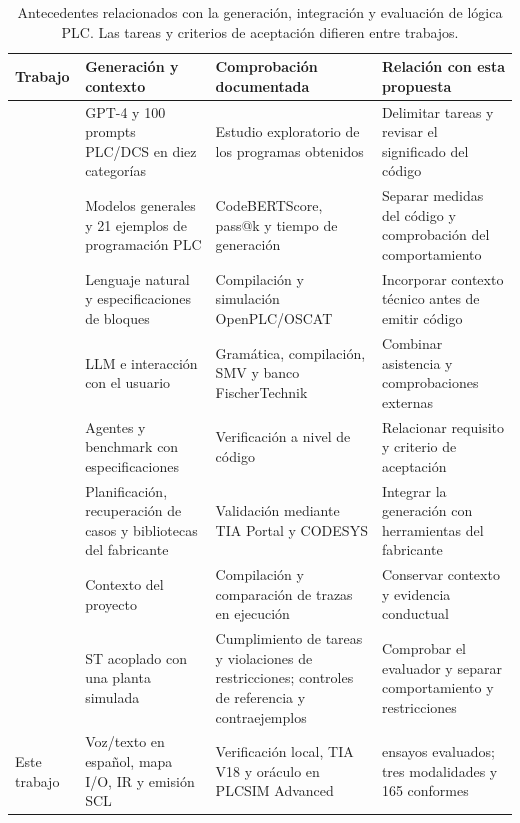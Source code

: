 \documentclass[a4paper,fleqn]{cas-dc}
\begin{document}
\begin{table}[!tp]
\caption{Antecedentes relacionados con la generación, integración y evaluación de lógica PLC. Las tareas y criterios de aceptación difieren entre trabajos.}
\label{tab:comparativa}
\small
\begin{tabularx}{\textwidth}{@{}p{} >{\raggedright\arraybackslash}X >{\raggedright\arraybackslash}X >{\raggedright\arraybackslash}X@{}}
\toprule Trabajo & Generación y contexto & Comprobación documentada & Relación con esta propuesta\\ \midrule
\citet{koziolek2023chatgpt} & GPT-4 y 100 prompts PLC/DCS en diez categorías & Estudio exploratorio de los programas obtenidos & Delimitar tareas y revisar el significado del código\\
\citet{tran2024universal} & Modelos generales y 21 ejemplos de programación PLC & CodeBERTScore, pass@k y tiempo de generación & Separar medidas del código y comprobación del comportamiento\\
\citet{koziolek2024rag} & Lenguaje natural y especificaciones de bloques & Compilación y simulación OpenPLC/OSCAT & Incorporar contexto técnico antes de emitir código\\
\citet{fakih2024llm4plc} & LLM e interacción con el usuario & Gramática, compilación, SMV y banco FischerTechnik & Combinar asistencia y comprobaciones externas\\
\citet{liu2024agents4plc} & Agentes y benchmark con especificaciones & Verificación a nivel de código & Relacionar requisito y criterio de aceptación\\
\citet{yang2025autoplc} & Planificación, recuperación de casos y bibliotecas del fabricante & Validación mediante TIA Portal y CODESYS & Integrar la generación con herramientas del fabricante\\
\citet{tu2026semaplc} & Contexto del proyecto & Compilación y comparación de trazas en ejecución & Conservar contexto y evidencia conductual\\
\citet{kim2026plcworld} & ST acoplado con una planta simulada & Cumplimiento de tareas y violaciones de restricciones; controles de referencia y contraejemplos & Comprobar el evaluador y separar comportamiento y restricciones\\
Este trabajo & Voz/texto en español, mapa I/O, IR y emisión SCL & Verificación local, TIA V18 y oráculo en PLCSIM Advanced & 180 ensayos evaluados; tres modalidades y 165 conformes\\
\bottomrule
\end{tabularx}
\end{table}
\end{document}
